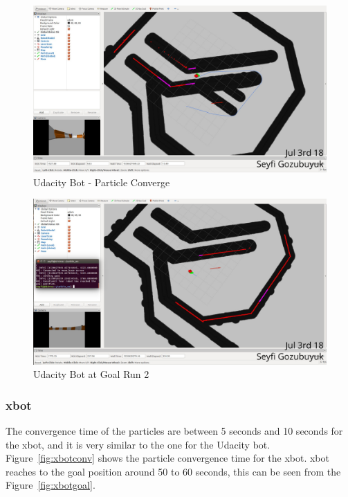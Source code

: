 \documentclass[10pt,journal,compsoc]{IEEEtran}
\begin{document}
\begin{figure}[thpb]
      \centering
      \includegraphics[width=\linewidth]{figures/UdacityBotConv.png}
      \caption{Udacity Bot - Particle Converge}
      \label{fig:ubotconv}
\end{figure}

\begin{figure}[thpb]
      \centering
      \includegraphics[width=\linewidth]{figures/UdacityBotGoal2.png}
      \caption{Udacity Bot at Goal Run 2}
      \label{fig:ubotgoal2}
\end{figure}

\subsubsection{xbot}
The convergence time of the particles are between 5 seconds and 10 seconds for the xbot, and it is very similar to the one for the Udacity bot. Figure~\ref{fig:xbotconv} shows the particle convergence time for the xbot. xbot reaches to the goal position around 50 to 60 seconds, this can be seen from the Figure~\ref{fig:xbotgoal}.
\end{document}

